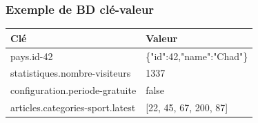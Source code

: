 \documentclass[handout]{beamer}
\begin{document}
		\begin{frame}
			\frametitle{Exemple de BD clé-valeur}

			\begin{tabular}{|l|l|}
				\hline
				\textbf{Clé} & \textbf{Valeur} \\ \hline\hline
				pays.id-42 & \{"id":42,"name":"Chad"\} \\ \hline
				statistiques.nombre-visiteurs & 1337 \\ \hline
				configuration.periode-gratuite & false \\ \hline
				articles.categories-sport.latest & [22, 45, 67, 200, 87] \\ \hline
			\end{tabular}

		\end{frame}
\end{document}
